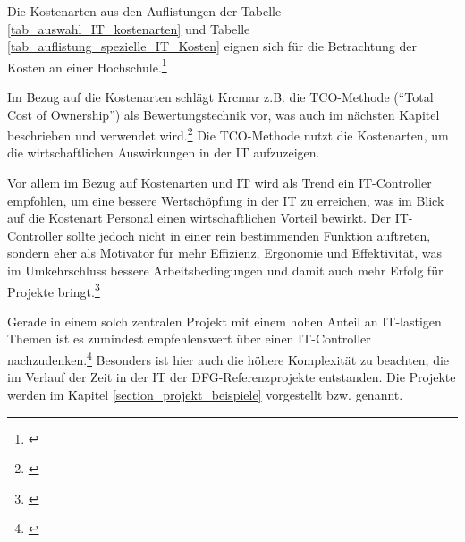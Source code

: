 Die Kostenarten aus den Auflistungen der Tabelle \ref{tab_auswahl_IT_kostenarten} und Tabelle \ref{tab_auflistung_spezielle_IT_Kosten} eignen sich für die Betrachtung der Kosten an einer Hochschule.\footnote{\cite{hansen_business_2009}}

Im Bezug auf die Kostenarten schlägt Krcmar z.B. die TCO-Methode (“Total Cost of Ownership”) als Bewertungstechnik vor, was auch im nächsten Kapitel beschrieben und verwendet wird.\footnote{\cite{krcmar_einfuhrung_2015}} Die TCO-Methode nutzt die Kostenarten, um die wirtschaftlichen Auswirkungen in der IT aufzuzeigen.

Vor allem im Bezug auf Kostenarten und IT wird als Trend ein IT-Controller empfohlen, um eine bessere Wertschöpfung in der IT zu erreichen, was im Blick auf die Kostenart Personal einen wirtschaftlichen Vorteil bewirkt. Der IT-Controller sollte jedoch nicht in einer rein bestimmenden Funktion auftreten, sondern eher als Motivator für mehr Effizienz, Ergonomie und Effektivität, was im Umkehrschluss bessere Arbeitsbedingungen und damit auch mehr Erfolg für Projekte bringt.\footnote{\cite{reim_erfolgsrechnung_2015}}

Gerade in einem solch zentralen Projekt mit einem hohen Anteil an IT-lastigen Themen ist es zumindest empfehlenswert über einen IT-Controller nachzudenken.\footnote{\cite{stratmann_it_2013}} Besonders ist hier auch die höhere Komplexität zu beachten, die im Verlauf der Zeit in der IT der DFG-Referenzprojekte entstanden. Die Projekte werden im Kapitel \ref{section_projekt_beispiele} vorgestellt bzw. genannt.